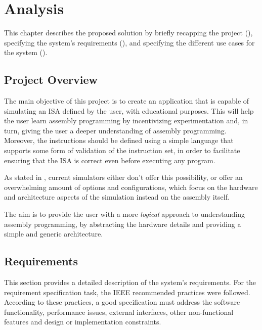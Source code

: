 \chapter{Analysis}\label{chap:analysis}
This chapter describes the proposed solution by briefly recapping the project (), specifying the system's requirements (), and specifying the different use cases for the system ().



\section{Project Overview}\label{sec:project-description}
The main objective of this project is to create an application that is capable of simulating an \gls{ISA} defined by the user, with educational purposes. This will help the user learn \gls{assembly} programming by incentivizing experimentation and, in turn, giving the user a deeper understanding of \gls{assembly} programming. Moreover, the instructions should be defined using a simple language that supports some form of validation of the instruction set, in order to facilitate ensuring that the \gls{ISA} is correct even before executing any program.

As stated in , current simulators either don't offer this possibility, or offer an overwhelming amount of options and configurations, which focus on the hardware and architecture aspects of the simulation instead on the \gls{assembly} itself.

The aim is to provide the user with a more \textit{logical} approach to understanding \gls{assembly} programming, by abstracting the hardware details and providing a simple and generic architecture.



\section{Requirements}\label{sec:requirements}
This section provides a detailed description of the system's requirements. For the requirement specification task, the IEEE recommended practices \parencite{IEEE830-1984} were followed. According to these practices, a good specification must address the software functionality, performance issues, external interfaces, other non-functional features and design or implementation constraints.

